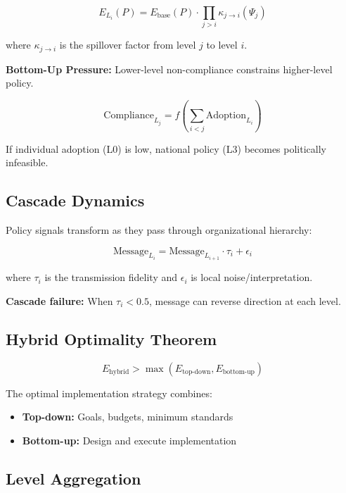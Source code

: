 \begin{equation}
E_{L_i}(P) = E_{\text{base}}(P) \cdot \prod_{j > i} \kappa_{j \to i}(\Psi_j)
\end{equation}

where $\kappa_{j \to i}$ is the spillover factor from level $j$ to level $i$.

\textbf{Bottom-Up Pressure:} Lower-level non-compliance constrains higher-level policy.

\begin{equation}
\text{Compliance}_{L_j} = f\left(\sum_{i < j} \text{Adoption}_{L_i}\right)
\end{equation}

If individual adoption (L0) is low, national policy (L3) becomes politically infeasible.

\subsection{Cascade Dynamics}

Policy signals transform as they pass through organizational hierarchy:

\begin{equation}
\boxed{
\text{Message}_{L_i} = \text{Message}_{L_{i+1}} \cdot \tau_i + \epsilon_i
}
\end{equation}

where $\tau_i$ is the transmission fidelity and $\epsilon_i$ is local noise/interpretation.

\textbf{Cascade failure:} When $\tau_i < 0.5$, message can reverse direction at each level.

\subsection{Hybrid Optimality Theorem}

\begin{equation}
\boxed{
E_{\text{hybrid}} > \max(E_{\text{top-down}}, E_{\text{bottom-up}})
}
\end{equation}

The optimal implementation strategy combines:
\begin{itemize}[nosep]
\item \textbf{Top-down:} Goals, budgets, minimum standards
\item \textbf{Bottom-up:} Design and execute implementation
\end{itemize}

\subsection{Level Aggregation}

